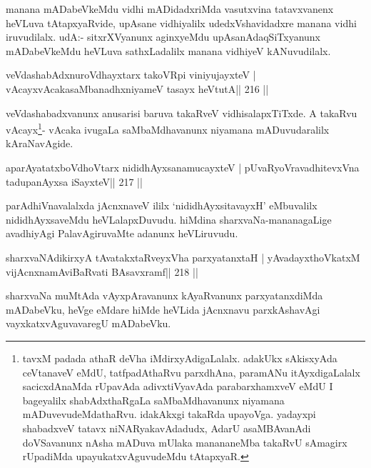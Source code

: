 \begin{artha}
manana mADabeVkeMdu vidhi mADidadxriMda vasutxvina tatavxvanenx heVLuva tAtapxyaRvide, upAsane vidhiyalilx udedxVshavidadxre manana vidhi iruvudilalx. udA:- sitxrXVyanunx aginxyeMdu upAsanAdaqSiTxyanunx mADabeVkeMdu heVLuva sathxLadalilx manana vidhiyeV kANuvudilalx.
\end{artha}

\begin{shl}
veVdashabAdxnuroVdhayxtarx takoVR\s pi viniyujayxteV |
vAcayxvAcakasaMbanadhxniyameV tasayx heVtutA\hfill || 216 ||
\end{shl}

\begin{artha}
veVdashabadxvanunx anusarisi baruva takaRveV vidhisalapxTiTxde. A takaRvu vAcayx\footnote{tavxM padada athaR deVha iMdirxyAdigaLalalx. adakUkx sAkisxyAda ceVtanaveV eMdU, tatfpadAthaRvu parxdhAna, paramANu itAyxdigaLalalx sacicxdAnaMda rUpavAda adivxtiVyavAda parabarxhamxveV eMdU I bageyalilx shabAdxthaRgaLa saMbaMdhavanunx niyamana mADuvevudeMdathaRvu. idakAkxgi takaRda upayoVga. yadayxpi shabadxveV tatavx niNARyakavAdadudx, AdarU asaMBAvanAdi doVSavanunx nAsha mADuva mUlaka manananeMba takaRvU sAmagirx rUpadiMda upayukatxvAguvudeMdu tAtapxyaR.}- vAcaka ivugaLa saMbaMdhavanunx niyamana mADuvudaralilx kAraNavAgide.
\end{artha}

\begin{shl}
aparAyatatxboVdhoV\s tarx nididhAyxsanamucayxteV |
pUvaRyoVravadhitevxVna tadupanAyxsa iSayxteV\hfill || 217 ||
\end{shl}

\begin{artha}
parAdhiVnavalalxda jAcnxnaveV ililx `nididhAyxsitavayxH' eMbuvalilx nididhAyxsaveMdu heVLalapxDuvudu. hiMdina sharxvaNa-mananagaLige avadhiyAgi PalavAgiruvaMte adanunx heVLiruvudu.
\end{artha}

\begin{shl}
sharxvaNAdikirxyA tAvatakxtaRveyxVha parxyatanxtaH |
yAvadayxthoVkatxM vijAcnxnamAviBaRvati BAsavxramf\hfill || 218 ||
\end{shl}

\begin{artha}
sharxvaNa muMtAda vAyxpAravanunx kAyaRvanunx parxyatanxdiMda mADabeVku, heVge eMdare hiMde heVLida jAcnxnavu parxkAshavAgi vayxkatxvAguvavaregU mADabeVku.
\end{artha}


